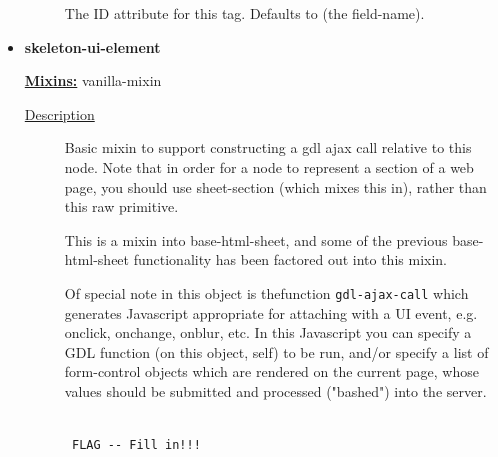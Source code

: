 \documentclass [11pt]{book}
\begin{document}
\begin{itemize}
\begin{description}
 The ID attribute for this tag. Defaults to (the field-name).




\end{description}







\item {}
\label{prim:skeleton-ui-element}
\textbf{skeleton-ui-element}


\textbf{
\underline{Mixins:}} vanilla-mixin





\begin{description}

\item [
\underline{Description}]


Basic mixin to support constructing a gdl ajax call 
relative to this node. Note that in order for a node to represent a section of a 
web page, you should use sheet-section (which mixes this in), rather than this raw 
primitive. 

This is a mixin into base-html-sheet, and some of the previous base-html-sheet 
functionality has been factored out into this mixin. 

Of special note in this object is thefunction \texttt{gdl-ajax-call} which generates 
Javascript appropriate for attaching with a UI event, e.g. onclick, onchange, 
onblur, etc. In this Javascript you can specify a GDL function (on this object, self) 
to be run, and/or specify a list of form-control objects which are rendered on 
the current page, whose values should be submitted and processed ("bashed") into the 
server.



\end{description}




\begin{figure}
\begin{lrbox}{\boxedverb}
\begin{minipage}{\linewidth}
{\small

\begin{verbatim}

 FLAG -- Fill in!!!


\end{verbatim}}
\end{minipage}
\end{lrbox}
\fbox{\usebox{\boxedverb}}


\end{figure}
\end{itemize}
\end{document}
